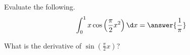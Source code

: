 \documentclass{ximera}
\author{Nela Lakos \and Kyle Parsons \and Bobby Ramsey}
\begin{document}
\begin{exercise}

Evaluate the following.
\[
\int_0^1 x\cos\left(\frac{\pi}{2}x^2\right) \d x = \answer{\frac{1}{\pi}}
\]
\begin{hint}
	What is the derivative of $\sin\left(\frac{\pi}{2}x\right)$?
\end{hint}
\end{exercise}
\end{document}
